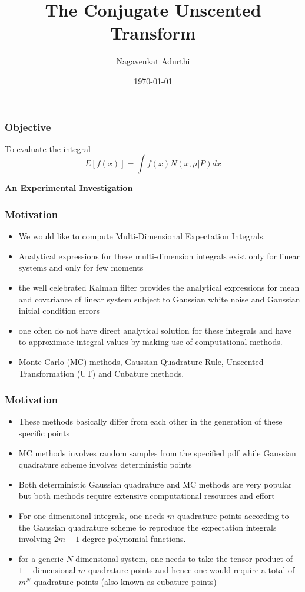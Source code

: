 \documentclass{beamer}
\title[The Conjugate Unscented Transform]{The Conjugate Unscented Transform }
\date{\today}
\author[Nagavenkat Adurthi]{Nagavenkat Adurthi}
\institute
{
  Department of Mechanical \& Aerospace Engineering\\
  University at Buffalo
}
\begin{document}
\frame{\maketitle} %

\begin{frame}

\frametitle{Objective}
\begin{block}{To evaluate the integral}
\large
\begin{equation*}
E[f(x)]=\int{f(x)N(x,\mu|P)}dx
\end{equation*}
\end{block}
\begin{block}{}
\large
{\bf An Experimental Investigation}
\end{block}
\end{frame}
\begin{frame}

\frametitle{Motivation}
\begin{itemize}[<+->]
	\item We would like to compute Multi-Dimensional Expectation Integrals.
	\item Analytical expressions for these multi-dimension integrals exist only for linear systems and only for few moments 
	\item the well celebrated Kalman filter provides the analytical expressions for mean and covariance of linear system subject to Gaussian white noise and Gaussian initial condition errors
	\item  one often do not have direct analytical solution for these integrals and have to approximate integral values by making use of computational methods.
	\item Monte Carlo (MC) methods, Gaussian Quadrature Rule, Unscented Transformation (UT) and Cubature methods.
		\end{itemize}
\end{frame}
\begin{frame}

\frametitle{Motivation}
\begin{itemize}[<+->]	
	\item These methods basically differ from each other in the generation of these specific points
	\item  MC methods involves random samples from the specified pdf while Gaussian quadrature scheme involves deterministic points
	\item Both deterministic Gaussian quadrature and MC methods are very popular but both methods require extensive computational resources and effort
	\item For one-dimensional integrals, one needs $m$ quadrature points according to the Gaussian quadrature scheme to reproduce the expectation integrals involving $2m-1$ degree polynomial functions.
	\item for a generic $N$-dimensional system, one needs to take the tensor product of $1-$dimensional $m$ quadrature points and hence one would require a total of $m^N$ quadrature points (also known as cubature points)
			\end{itemize}
\end{frame}
\end{document}
